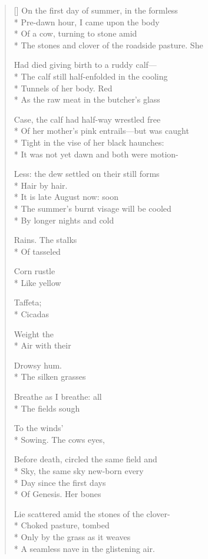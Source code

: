 \label{ch:another_creation_myth}
\settowidth{\versewidth}{                       It is late August now: soon }
\begin{verse}[\versewidth]
On the first day of summer, in the formless\\*
Pre-dawn hour, I came upon the body\\*
Of a cow, turning to stone amid\\*
The stones and clover of the roadside pasture.  She

Had died giving birth to a ruddy calf---\\*
The calf still half-enfolded in the cooling\\*
Tunnels of her body.     Red\\*
As the raw meat in the butcher's glass

Case, the calf had half-way wrestled free\\*
Of her mother's pink entrails---but was caught\\*
Tight in the vise of her black haunches:\\*
It was not yet dawn and both were motion-

Less:  the dew settled on their still forms\\*
Hair by hair.     \\*
                       It is late August now: soon \\*
The summer's burnt visage will be cooled\\*
By longer nights and cold

Rains.  The stalks\\*
Of tasseled

Corn rustle\\*
Like yellow

Taffeta;\\*
Cicadas

Weight the\\*
Air with their

Drowsy hum.\\*
The silken grasses

Breathe as I breathe:   all\\*
The fields sough

To the winds'\\*
Sowing.    The cows eyes,

Before death, circled the same field and\\*
Sky, the same sky new-born every\\*
Day since the first days\\*
Of Genesis.     Her bones

Lie scattered amid the stones of the clover-\\*
Choked pasture, tombed\\*
Only by the grass as it weaves\\*
A seamless nave in the glistening air.
\end{verse}
